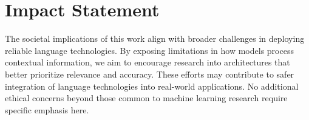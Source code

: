 \section*{Impact Statement}
The societal implications of this work align with broader challenges in deploying reliable language technologies. By exposing limitations in how models process contextual information, we aim to encourage research into architectures that better prioritize relevance and accuracy. These efforts may contribute to safer integration of language technologies into real-world applications. No additional ethical concerns beyond those common to machine learning research require specific emphasis here.